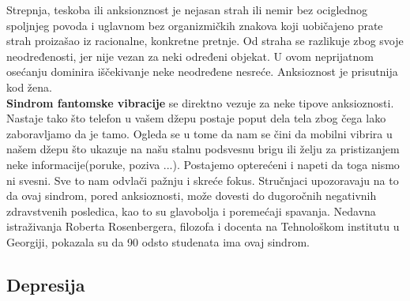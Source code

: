 \documentclass[a4paper]{article}
\begin{document}
{		Strepnja, teskoba ili anksionznost je nejasan strah ili nemir bez ociglednog spoljnjeg povoda i uglavnom bez organizmičkih znakova koji uobičajeno prate strah proizašao iz racionalne, konkretne pretnje. Od straha se razlikuje zbog svoje neodređenosti, jer nije vezan za neki određeni objekat. U ovom neprijatnom osećanju dominira iščekivanje neke neodređene nesreće. Anksioznost je prisutnija kod žena. \\
		\textbf{Sindrom fantomske vibracije} se direktno vezuje za neke tipove anksioznosti. Nastaje tako što telefon u vašem džepu postaje poput dela tela zbog čega lako zaboravljamo da je tamo. Ogleda se u tome da nam se čini da mobilni vibrira u našem džepu što ukazuje na našu stalnu podsvesnu brigu ili želju za pristizanjem neke informacije(poruke, poziva ...). Postajemo opterećeni i napeti da toga nismo ni svesni. Sve to nam odvlači pažnju i skreće fokus. Stručnjaci upozoravaju na to da ovaj sindrom, pored anksioznosti, može dovesti do dugoročnih negativnih zdravstvenih posledica, kao to su glavobolja i poremećaji spavanja. Nedavna istraživanja Roberta Rosenbergera, filozofa i docenta na Tehnološkom institutu u Georgiji, pokazala su da 90 odsto studenata ima ovaj sindrom.
		
		\subsection{Depresija}
		\label{subsec:depresija}
		
}
\end{document}
